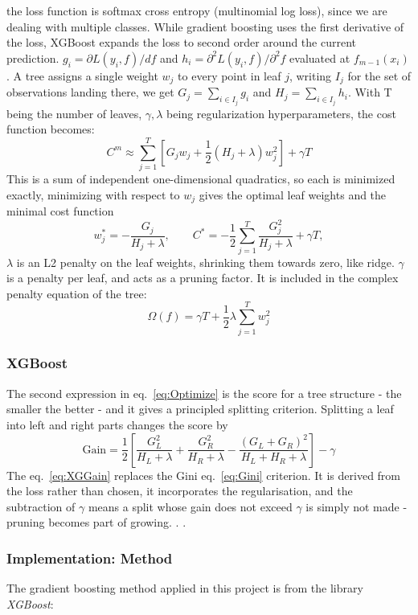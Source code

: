 the loss function is softmax cross entropy (multinomial log loss), since we are dealing
with multiple classes. 
While gradient boosting uses the first derivative of the loss, XGBoost expands
the loss to second order around the current prediction. 
$g_i = \partial L(y_i, f)/df$ and $h_i = \partial^2 L(y_i,f)/ \partial^2 f$ evaluated
at $f_{m-1}(x_i)$. A tree assigns a single weight $w_j$ to every point in leaf $j$,
writing $I_j$ for the set of observations landing there, we get $G_j = \sum_{i\in I_j}g_i$
and $H_j = \sum_{i\in I_j}h_i$. With T being the number of leaves, $\gamma, \lambda$ being 
regularization hyperparameters, the cost function becomes:
\begin{equation}
    C^{m} \approx \sum_{j=1}^{T}[G_jw_j + \frac{1}{2}(H_j + \lambda)w_j^2] + \gamma T
    \label{eq:Cost_XG}
\end{equation}  
This is a sum of independent one-dimensional quadratics, so each is minimized 
exactly, minimizing with respect to $w_j$ gives the optimal leaf weights 
and the minimal cost function
\begin{equation}
    w_j^* = - \frac{G_j}{H_j + \lambda}, \qquad
    C^* = -\frac{1}{2}\sum_{j=1}^{T}\frac{G_j^2}{H_j + \lambda} + \gamma T ,
    \label{eq:Optimize}
\end{equation}
$\lambda $ is an L2 penalty on the leaf weights, shrinking them towards zero,
like ridge. $\gamma$ is a penalty per leaf, and acts as a pruning factor. It is included in the complex penalty
equation of the tree:
\begin{equation}
    \Omega (f) = \gamma T + \frac{1}{2}\lambda\sum_{j=1}^{T}w_j^2
    \label{eq:Penalty}
\end{equation}
\subsubsection{XGBoost}
The second expression in eq.~\eqref{eq:Optimize} is the score for a tree structure 
- the smaller the better - and it gives a principled splitting criterion.  
Splitting a leaf into left and right parts changes the score by
\begin{equation}
    \text{Gain} = \frac{1}{2}[\frac{G_L^2}{H_L + \lambda} + \frac{G_R^2}{H_R + \lambda} - \frac{(G_L + G_R)^2}{H_L + H_R + \lambda}] - \gamma
    \label{eq:XGGain}
\end{equation}
The eq.~\eqref{eq:XGGain} replaces the Gini eq.~\eqref{eq:Gini} criterion.
It is derived from the loss rather than chosen, it incorporates the regularisation,
and the subtraction of $\gamma$ means a split whose gain does not exceed $\gamma$
is simply not made - pruning becomes part of growing. \cite[p.~212-220]{LectureNotes}.
\cite{chenXGBoostScalableTree2016}. 
\subsubsection{Implementation: Method}
The gradient boosting method applied in this project is from the
library \textit{XGBoost}:
